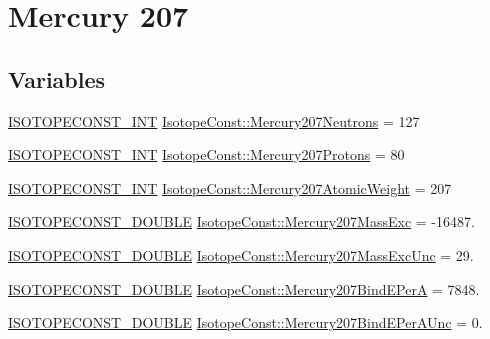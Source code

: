 \hypertarget{group___isotope_const-_mercury-_hg207}{}\section{Mercury 207}
\label{group___isotope_const-_mercury-_hg207}
\subsection*{Variables}
\begin{DoxyCompactItemize}
\item 
\mbox{\hyperlink{group___isotope_const-_macros_ga5f18360b3e99483a35c32d789e62621c}{I\+S\+O\+T\+O\+P\+E\+C\+O\+N\+S\+T\+\_\+\+I\+NT}} \mbox{\hyperlink{group___isotope_const-_mercury-_hg207_ga20874f92826d3685a34e6eebc13a5396}{Isotope\+Const\+::\+Mercury207\+Neutrons}} = 127
\item 
\mbox{\hyperlink{group___isotope_const-_macros_ga5f18360b3e99483a35c32d789e62621c}{I\+S\+O\+T\+O\+P\+E\+C\+O\+N\+S\+T\+\_\+\+I\+NT}} \mbox{\hyperlink{group___isotope_const-_mercury-_hg207_ga894fd60523f5ffa7ea5ef37394463d82}{Isotope\+Const\+::\+Mercury207\+Protons}} = 80
\item 
\mbox{\hyperlink{group___isotope_const-_macros_ga5f18360b3e99483a35c32d789e62621c}{I\+S\+O\+T\+O\+P\+E\+C\+O\+N\+S\+T\+\_\+\+I\+NT}} \mbox{\hyperlink{group___isotope_const-_mercury-_hg207_ga92f00366cfbdad2f19e7edab814bdfdd}{Isotope\+Const\+::\+Mercury207\+Atomic\+Weight}} = 207
\item 
\mbox{\hyperlink{group___isotope_const-_macros_ga8f45a7272ce02c0b4c65c44636ed719a}{I\+S\+O\+T\+O\+P\+E\+C\+O\+N\+S\+T\+\_\+\+D\+O\+U\+B\+LE}} \mbox{\hyperlink{group___isotope_const-_mercury-_hg207_gaba1f319f9e283dfca84867fe6fbcd486}{Isotope\+Const\+::\+Mercury207\+Mass\+Exc}} = -\/16487.
\item 
\mbox{\hyperlink{group___isotope_const-_macros_ga8f45a7272ce02c0b4c65c44636ed719a}{I\+S\+O\+T\+O\+P\+E\+C\+O\+N\+S\+T\+\_\+\+D\+O\+U\+B\+LE}} \mbox{\hyperlink{group___isotope_const-_mercury-_hg207_gaea5121671fbe8a6ba41f95a00cf5f6d3}{Isotope\+Const\+::\+Mercury207\+Mass\+Exc\+Unc}} = 29.
\item 
\mbox{\hyperlink{group___isotope_const-_macros_ga8f45a7272ce02c0b4c65c44636ed719a}{I\+S\+O\+T\+O\+P\+E\+C\+O\+N\+S\+T\+\_\+\+D\+O\+U\+B\+LE}} \mbox{\hyperlink{group___isotope_const-_mercury-_hg207_ga6a2fea0b7dfda1df65f4cd25c7525b78}{Isotope\+Const\+::\+Mercury207\+Bind\+E\+PerA}} = 7848.
\item 
\mbox{\hyperlink{group___isotope_const-_macros_ga8f45a7272ce02c0b4c65c44636ed719a}{I\+S\+O\+T\+O\+P\+E\+C\+O\+N\+S\+T\+\_\+\+D\+O\+U\+B\+LE}} \mbox{\hyperlink{group___isotope_const-_mercury-_hg207_ga0c4fca903d9a0c0de09c47fad086ed7d}{Isotope\+Const\+::\+Mercury207\+Bind\+E\+Per\+A\+Unc}} = 0.

\end{DoxyCompactItemize}
